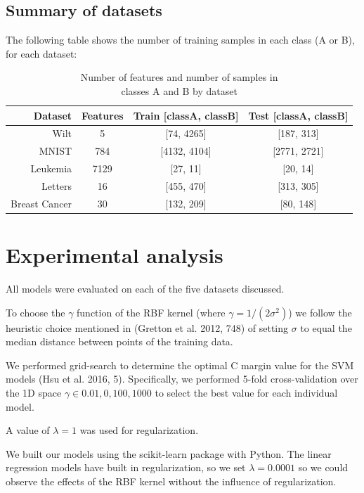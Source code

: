 \documentclass[letterpaper, 11pt]{article}
\begin{document}
\subsection{Summary of datasets}

The following table shows the number of training samples in each class (A or B), for each dataset:

\begin{table}[h]
  \centering
  \begin{tabular}{r|c c c}
    Dataset       & Features & Train [classA, classB] & Test [classA, classB] \\
    \hline
    Wilt          & 5        & [74, 4265]             & [187, 313] \\
    MNIST         & 784      & [4132, 4104]           & [2771, 2721] \\
    Leukemia      & 7129     & [27, 11]               & [20, 14] \\
    Letters       & 16       & [455, 470]             & [313, 305] \\
    Breast Cancer & 30       & [132, 209]             & [80, 148]
\end{tabular}
  \caption{Number of features and number of samples in \\classes A and B by dataset}
\end{table}

\section{Experimental analysis}

All models were evaluated on each of the five datasets discussed.

To choose the $\gamma$ function of the RBF kernel (where $\gamma = 1/(2\sigma^2)$) we follow the heuristic choice mentioned in (Gretton et al. 2012, 748) of setting $\sigma$ to equal the median distance between points of the training data.

We performed grid-search to determine the optimal C margin value for the SVM models (Hsu et al. 2016, 5). Specifically, we performed 5-fold cross-validation over the 1D space $\gamma \in {0.01, 0, 100, 1000}$ to select the best value for each individual model.

A value of $\lambda=1$ was used for regularization.

We built our models using the scikit-learn package with Python. The linear regression models have built in regularization, so we set $\lambda=0.0001$ so we could observe the effects of the RBF kernel without the influence of regularization.
\end{document}
